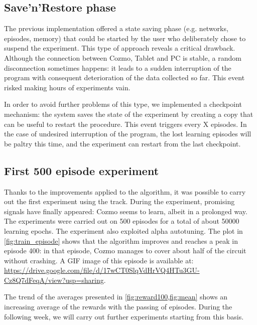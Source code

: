 \documentclass[a4paper, 11pt]{article}
\begin{document}
	\subsection{Save'n'Restore phase}
	
	The previous implementation offered a state saving phase (e.g. networks, episodes, memory) that could be started by the user who deliberately chose to suspend the experiment. This type of approach reveals a critical drawback. 
	Although the connection between Cozmo, Tablet and PC is stable, a random disconnection sometimes happens: it leads to a sudden interruption of the program with consequent deterioration of the data collected so far.
	This event risked making hours of experiments vain.
	
	In order to avoid further problems of this type, we implemented a checkpoint mechanism: the system saves the state of the experiment by creating a copy that can be useful to restart the procedure. This event triggers every X episodes. In the case of undesired interruption of the program, the lost learning episodes will be paltry this time, and the experiment can restart from the last checkpoint.
	
	\subsection{First 500 episode experiment}
	
	Thanks to the improvements applied to the algorithm, it was possible to carry out the first experiment using the track. During the experiment, promising signals have finally appeared: Cozmo seems to learn, albeit in a prolonged way. The experiments were carried out on 500 episodes for a total of about 50000 learning epochs. The experiment also exploited alpha autotuning. The plot in \vref{fig:train_episode} shows that the algorithm improves and reaches a peak in episode 400: in that episode, Cozmo manages to cover about half of the circuit without crashing. A GIF image of this episode is available at: \url{https://drive.google.com/file/d/17wCT0SlqVdHrVQ4HTu3GU-Cz8Q7dFeqA/view?usp=sharing}.
	
	The trend of the averages presented in \vref{fig:reward100,fig:mean} shows an increasing average of the rewards with the passing of episodes. During the following week, we will carry out further experiments starting from this basis.
	
\end{document}
